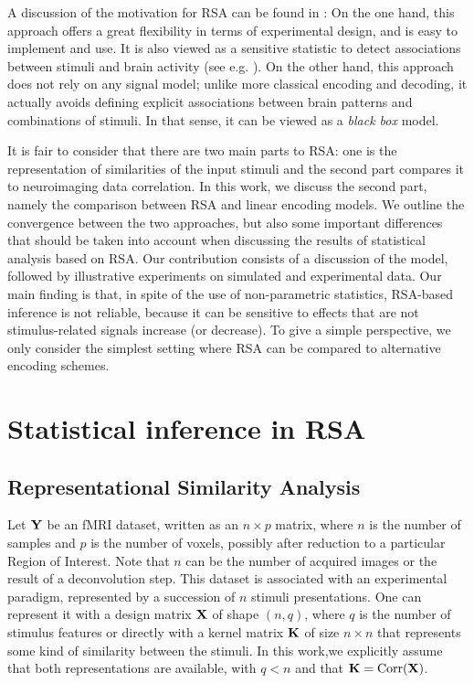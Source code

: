 \documentclass{article}
\begin{document}
A discussion of the motivation for RSA can be found in \cite{Nili2014}:
%
On the one hand, this approach offers a great flexibility in terms of
experimental design, and is easy to implement and use.
%
It is also viewed as a sensitive statistic to detect associations
between stimuli and brain activity (see e.g. \cite{borghesani:hal-00986606}).
%
On the other hand, this approach does not rely on any signal model;
unlike more classical encoding and decoding, it actually avoids
defining explicit associations between brain patterns and combinations
of stimuli. 
%
In that sense, it can be viewed as a \textit{black box} model.

It is fair to consider that there are two main parts to RSA: one is
the representation of similarities of the input stimuli and the second
part compares it to neuroimaging data correlation.
%
In this work, we discuss the second part, namely the comparison
between RSA and linear encoding models. 
%
We outline the convergence between the two approaches, but also some
important differences that should be taken into account when
discussing the results of statistical analysis based on RSA.
%
Our contribution consists of a discussion of the model, followed by
illustrative experiments on simulated and experimental data.
%
Our main finding is that, in spite of the use of non-parametric
statistics, RSA-based inference is not reliable, because it can be
sensitive to effects that are not stimulus-related signals increase
(or decrease).
%
To give a simple perspective, we only consider the simplest setting
where RSA can be compared to alternative encoding schemes.


\section{Statistical inference in RSA}
\label{rsa}
\subsection{Representational Similarity Analysis}
% 
Let $\mathbf{Y}$ be an fMRI dataset, written as an $n \times p$ matrix, where
$n$ is the number of samples and $p$ is the number of voxels, possibly
after reduction to a particular Region of Interest.
%
Note that $n$ can be the number of acquired images %
or the result
of a deconvolution step.
%
This dataset is associated with an experimental paradigm, represented
by a succession of $n$ stimuli presentations.
%
One can represent it with a design matrix $\mathbf{X}$ of
shape $(n, q)$, where $q$ is the number of stimulus features or directly
with a kernel matrix $\mathbf{K}$ of size $n \times n$ that represents some
kind of similarity between the stimuli.
%
In this work,we explicitly assume that both representations are
available, with $q<n$ and that $\mathbf{K}=\text{Corr}(\mathbf{X})$.
\end{document}
